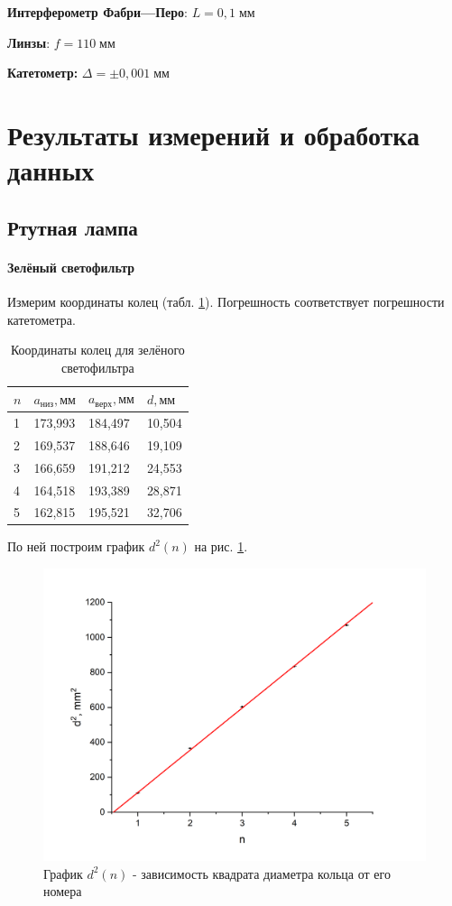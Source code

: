 \documentclass[12pt,a4paper]{extreport}
\newcommand{\Equip}[3]{
	
	{\bf #1:} $\Delta = \pm #2\; #3$}
\newcommand{\equip}[1]{
	
	{\bf #1}}
\begin{document}
\equip{Интерферометр Фабри---Перо}: $ L = 0,1\; мм $
\equip{Линзы}: $ f = 110\; мм $
\Equip{Катетометр}{0,001}{мм}

\section{Результаты измерений и обработка данных}
\subsection{Ртутная лампа}

\paragraph{Зелёный светофильтр}

Измерим координаты колец (табл. \ref{tab:greendata}).
Погрешность соответствует погрешности катетометра.
\begin{table}[!h]
	\centering
	\begin{tabular}{|l|l|l|l|}
		\hline
		$ n $ & $a_{низ}, мм $ & $a_{верх}, мм$ & $d, мм$     \\ \hline
		1     & 173,993      & 184,497    & 10,504 \\ \hline
		2     & 169,537      & 188,646    & 19,109 \\ \hline
		3     & 166,659      & 191,212    & 24,553 \\ \hline
		4     & 164,518      & 193,389    & 28,871 \\ \hline
		5     & 162,815      & 195,521    & 32,706 \\ \hline
	\end{tabular}
	\caption{Координаты колец для зелёного светофильтра}
	\label{tab:greendata}
\end{table}

По ней построим график $ d^2(n) $ на рис. \ref{fig:screenshot5}.

\begin{figure}[!h]
	\centering
	\includegraphics[width=0.7\linewidth]{1.png}
	\caption{График $d^2(n)$ - зависимость квадрата диаметра кольца от его номера}
	\label{fig:screenshot5}
\end{figure}
\end{document}
